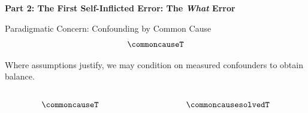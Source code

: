 \documentclass[
  ignorenonframetext,
  aspectratio=169,
]{beamer}
\begin{document}
\begin{frame}{\textbf{Part 2: The First Self-Inflicted Error: The
\emph{What} Error}}
\label{part-2-the-first-self-inflicted-error-the-what-error}
\begin{block}{Paradigmatic Concern: Confounding by Common Cause}
\label{paradigmatic-concern-confounding-by-common-cause}
\[\commoncauseT\]
\end{block}

\begin{block}{Where assumptions justify, we may condition on measured
confounders to obtain balance.}
\label{where-assumptions-justify-we-may-condition-on-measured-confounders-to-obtain-balance.}
\begin{columns}[T]
\begin{column}{0.5\linewidth}
\[
\commoncauseT
\]
\end{column}

\begin{column}{0.5\linewidth}
\[
\commoncausesolvedT
\]
\end{column}
\end{columns}
\end{block}
\end{frame}
\end{document}
